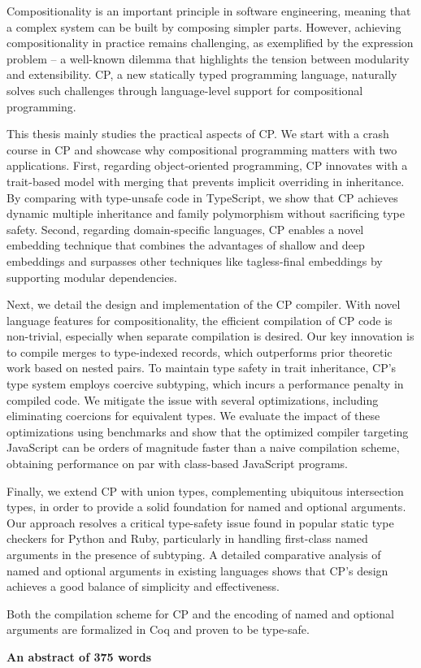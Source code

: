 Compositionality is an important principle in software engineering, meaning that
a complex system can be built by composing simpler parts. However, achieving
compositionality in practice remains challenging, as exemplified by the
expression problem -- a well-known dilemma that highlights the tension between
modularity and extensibility. CP, a new statically typed programming language,
naturally solves such challenges through language-level support for
compositional programming.

This thesis mainly studies the practical aspects of CP. We start with a crash
course in CP and showcase why compositional programming matters with two
applications. First, regarding object-oriented programming, CP innovates with a
trait-based model with merging that prevents implicit overriding in inheritance.
By comparing with type-unsafe code in TypeScript, we show that CP achieves
dynamic multiple inheritance and family polymorphism without sacrificing type
safety. Second, regarding domain-specific languages, CP enables a novel
embedding technique that combines the advantages of shallow and deep embeddings
and surpasses other techniques like tagless-final embeddings by supporting
modular dependencies.

Next, we detail the design and implementation of the CP compiler. With novel
language features for compositionality, the efficient compilation of CP code is
non-trivial, especially when separate compilation is desired. Our key innovation
is to compile merges to type-indexed records, which outperforms prior theoretic
work based on nested pairs. To maintain type safety in trait inheritance, CP's
type system employs coercive subtyping, which incurs a performance penalty in
compiled code. We mitigate the issue with several optimizations, including
eliminating coercions for equivalent types. We evaluate the impact of these
optimizations using benchmarks and show that the optimized compiler targeting
JavaScript can be orders of magnitude faster than a naive compilation scheme,
obtaining performance on par with class-based JavaScript programs.

Finally, we extend CP with union types, complementing ubiquitous intersection
types, in order to provide a solid foundation for named and optional arguments.
Our approach resolves a critical type-safety issue found in popular static type
checkers for Python and Ruby, particularly in handling first-class named
arguments in the presence of subtyping. A detailed comparative analysis of named
and optional arguments in existing languages shows that CP's design achieves a
good balance of simplicity and effectiveness.

Both the compilation scheme for CP and the encoding of named and optional
arguments are formalized in Coq and proven to be type-safe.

\vspace{1.5\baselineskip}

\noindent\makebox[\linewidth]{\rule{0.7\textwidth}{0.4pt}}

\begin{center}
\textbf{An abstract of 375 words}
\end{center}
